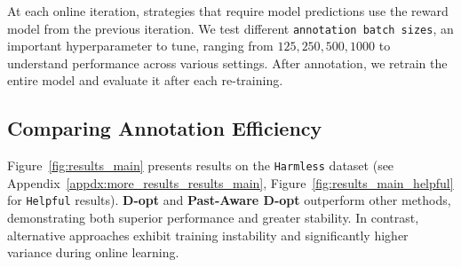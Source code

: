 At each online iteration, strategies that require model predictions use the reward model from the previous iteration. We test different \texttt{annotation batch sizes}, an important hyperparameter to tune, ranging from ${125, 250, 500, 1000}$ to understand performance across various settings. After annotation, we retrain the entire model and evaluate it after each re-training.






\subsection{Comparing Annotation Efficiency}
Figure~\ref{fig:results_main} presents results on the \texttt{Harmless} dataset (see Appendix~\ref{appdx:more_results_results_main}, Figure~\ref{fig:results_main_helpful} for \texttt{Helpful} results). \textbf{D-opt} and \textbf{Past-Aware D-opt} outperform other methods, demonstrating both superior performance and greater stability. In contrast, alternative approaches exhibit training instability and significantly higher variance during online learning.

